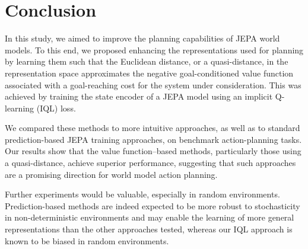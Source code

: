\documentclass{article} %
\begin{document}

\section{Conclusion}

In this study, we aimed to improve the planning capabilities of JEPA world models. To this end, we proposed enhancing the representations used for planning by learning them such that the Euclidean distance, or a quasi-distance, in the representation space approximates the negative goal-conditioned value function associated with a goal-reaching cost for the system under consideration. This was achieved by training the state encoder of a JEPA model using an implicit Q-learning (IQL) loss.

We compared these methods to more intuitive approaches, as well as to standard prediction-based JEPA training approaches, on benchmark action-planning tasks. Our results show that the value function–based methods, particularly those using a quasi-distance, achieve superior performance, suggesting that such approaches are a promising direction for world model action planning.

Further experiments would be valuable, especially in random environments. Prediction-based methods are indeed expected to be more robust to stochasticity in non-deterministic environments and may enable the learning of more general representations than the other approaches tested, whereas our IQL approach is known to be biased in random environments.
\end{document}
